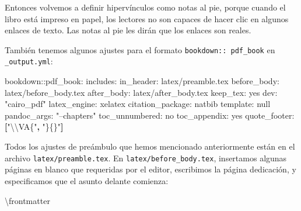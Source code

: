 \documentclass[12pt,]{krantz}
\makeatletter
\newenvironment{Shaded}{\begin{snugshade}}{\end{snugshade}}
\newcommand{\KeywordTok}[1]{\textcolor[rgb]{0.13,0.29,0.53}{\textbf{#1}}}
\newcommand{\DataTypeTok}[1]{\textcolor[rgb]{0.13,0.29,0.53}{#1}}
\newcommand{\StringTok}[1]{\textcolor[rgb]{0.31,0.60,0.02}{#1}}
\newcommand{\FunctionTok}[1]{\textcolor[rgb]{0.00,0.00,0.00}{#1}}
\newcommand{\ExtensionTok}[1]{#1}
\newcommand{\AttributeTok}[1]{\textcolor[rgb]{0.77,0.63,0.00}{#1}}
\newcommand{\NormalTok}[1]{#1}
\newenvironment{kframe}{%
\medskip{}
\setlength{\fboxsep}{.8em}
 \def\at@end@of@kframe{}%
 \ifinner\ifhmode%
  \def\at@end@of@kframe{\end{minipage}}%
  \begin{minipage}{\columnwidth}%
 \fi\fi%
 \def\FrameCommand##1{\hskip\@totalleftmargin \hskip-\fboxsep
 \colorbox{shadecolor}{##1}\hskip-\fboxsep
     \hskip-\linewidth \hskip-\@totalleftmargin \hskip\columnwidth}%
 \MakeFramed {\advance\hsize-\width
   \@totalleftmargin\z@ \linewidth\hsize
   \@setminipage}}%
 {\par\unskip\endMakeFramed%
 \at@end@of@kframe}
\renewenvironment{Shaded}{\begin{kframe}}{\end{kframe}}
\theoremstyle{definition}
\theoremstyle{definition}
\theoremstyle{definition}
\theoremstyle{remark}
\makeatother
\begin{document}
Entonces volvemos a definir hipervínculos como notas al pie, porque
cuando el libro está impreso en papel, los lectores no son capaces de
hacer clic en algunos enlaces de texto. Las notas al pie les dirán que
los enlaces son reales.

\begin{Shaded}
\end{Shaded}

También tenemos algunos ajustes para el formato
\texttt{bookdown::\ pdf\_book} en
\texttt{\_output.yml}:

\begin{Shaded}
\begin{Highlighting}[]
\FunctionTok{bookdown:}\AttributeTok{:pdf_book:}
  \FunctionTok{includes:}
    \FunctionTok{in_header:}\AttributeTok{ latex/preamble.tex}
    \FunctionTok{before_body:}\AttributeTok{ latex/before_body.tex}
    \FunctionTok{after_body:}\AttributeTok{ latex/after_body.tex}
  \FunctionTok{keep_tex:}\AttributeTok{ yes}
  \FunctionTok{dev:}\AttributeTok{ }\StringTok{"cairo_pdf"}
  \FunctionTok{latex_engine:}\AttributeTok{ xelatex}
  \FunctionTok{citation_package:}\AttributeTok{ natbib}
  \FunctionTok{template:}\AttributeTok{ }\DataTypeTok{null}
  \FunctionTok{pandoc_args:}\AttributeTok{ }\StringTok{"--chapters"}
  \FunctionTok{toc_unnumbered:}\AttributeTok{ no}
  \FunctionTok{toc_appendix:}\AttributeTok{ yes}
  \FunctionTok{quote_footer:}\AttributeTok{ }\KeywordTok{[}\StringTok{"\textbackslash{}\textbackslash{}VA\{"}\KeywordTok{,} \StringTok{"\}\{\}"}\KeywordTok{]}
\end{Highlighting}
\end{Shaded}

Todos los ajustes de preámbulo que hemos mencionado anteriormente están
en el archivo \texttt{latex/preamble.tex}. En
\texttt{latex/before\_body.tex}, insertamos algunas páginas en blanco
que requeridas por el editor, escribimos la página dedicación, y
especificamos que el asunto delante comienza:

\begin{Shaded}
\begin{Highlighting}[]
\FunctionTok{\textbackslash{}frontmatter}
\end{Highlighting}
\end{Shaded}
\end{document}
